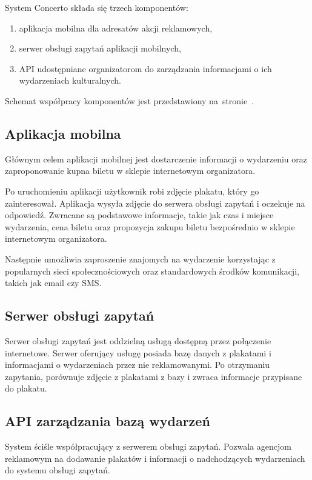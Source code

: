 \documentclass[10pt]{dokument-ppi}
\begin{document}
System Concerto składa się trzech komponentów:
\begin{enumerate}
    \item aplikacja mobilna dla adresatów akcji reklamowych,
    \item serwer obsługi zapytań aplikacji mobilnych,
    \item API udostępniane organizatorom do zarządzania informacjami o ich
        wydarzeniach kulturalnych.
\end{enumerate}
Schemat współpracy komponentów jest przedstawiony
na~stronie~\pageref{fig:schemat_komponentow}.

\subsection{Aplikacja mobilna}
Głównym celem aplikacji mobilnej jest dostarczenie informacji o wydarzeniu oraz
zaproponowanie kupna biletu w sklepie internetowym organizatora.

Po uruchomieniu aplikacji użytkownik robi zdjęcie plakatu, który go
zainteresował. Aplikacja wysyła zdjęcie do serwera obsługi zapytań i oczekuje na
odpowiedź. Zwracane są podstawowe informacje, takie jak czas i miejsce
wydarzenia, cena biletu oraz propozycja zakupu biletu bezpośrednio w sklepie
internetowym organizatora.

Następnie umożliwia zaproszenie znajomych na wydarzenie korzystając z
popularnych sieci społecznościowych oraz standardowych środków komunikacji,
takich jak email czy SMS.

\subsection{Serwer obsługi zapytań}
Serwer obsługi zapytań jest oddzielną usługą dostępną przez połączenie
internetowe. Serwer oferujący usługę posiada bazę danych z plakatami i
informacjami o wydarzeniach przez nie reklamowanymi. Po otrzymaniu zapytania,
porównuje zdjęcie z plakatami z bazy i zwraca informacje przypisane do plakatu.

\subsection{API zarządzania bazą wydarzeń}
System ściśle współpracujący z serwerem obsługi zapytań. Pozwala agencjom
reklamowym na dodawanie plakatów i informacji o nadchodzących wydarzeniach do
systemu obsługi zapytań.
\end{document}
